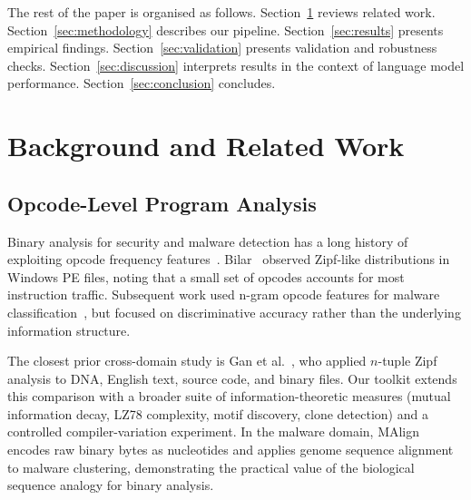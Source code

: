 \documentclass[10pt,twocolumn]{article}
\begin{document}
The rest of the paper is organised as follows.
Section~\ref{sec:background} reviews related work.
Section~\ref{sec:methodology} describes our pipeline.
Section~\ref{sec:results} presents empirical findings.
Section~\ref{sec:validation} presents validation and robustness checks.
Section~\ref{sec:discussion} interprets results in the context of language
model performance.
Section~\ref{sec:conclusion} concludes.

\section{Background and Related Work}
\label{sec:background}

\subsection{Opcode-Level Program Analysis}

Binary analysis for security and malware detection has a long history of
exploiting opcode frequency features~\cite{bilar2007opcodes,
masud2008machine}.  Bilar~\cite{bilar2007opcodes} observed Zipf-like
distributions in Windows PE files, noting that a small set of opcodes accounts
for most instruction traffic.  Subsequent work used n-gram opcode features for
malware classification~\cite{masud2008machine,santos2013opcode}, but focused
on discriminative accuracy rather than the underlying information structure.

The closest prior cross-domain study is Gan et al.~\cite{gan2009statistical},
who applied $n$-tuple Zipf analysis to DNA, English text, source code, and
binary files.  Our toolkit extends this comparison with a broader suite of
information-theoretic measures (mutual information decay, LZ78 complexity,
motif discovery, clone detection) and a controlled compiler-variation
experiment.  In the malware domain, MAlign~\cite{saha2024malign} encodes
raw binary bytes as nucleotides and applies genome sequence alignment to
malware clustering, demonstrating the practical value of the biological
sequence analogy for binary analysis.
\end{document}
